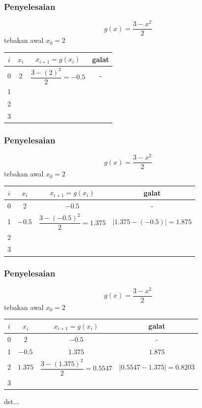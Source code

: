 \documentclass{beamer}
\begin{document}

\begin{frame}
\frametitle{Penyelesaian}
\begin{equation}
g(x) = \dfrac{3-x^2}{2}
\nonumber
\end{equation}
tebakan awal $x_0=2$
\\\begin{center}
\begin{tabular}{|c|c|c|c|}
\hline
	$i$ & $x_i$ & $x_{i+1} = g(x_i)$ & galat \\
\hline
	0 & 2 & $\dfrac{3 - (2)^2}{2} = -0.5$ & -\\
\hline
	1 &  &  & \\
\hline
	2 &  &  & \\
\hline
	3 &  &  & \\
\hline
\end{tabular}
\end{center}
\end{frame}


\begin{frame}
\frametitle{Penyelesaian}
\begin{equation}
g(x) = \dfrac{3-x^2}{2}
\nonumber
\end{equation}
tebakan awal $x_0=2$
\\\begin{center}
\begin{tabular}{|c|c|c|c|}
\hline
	$i$ & $x_i$ & $x_{i+1} = g(x_i)$ & galat \\
\hline
	0 & 2 & $-0.5$ & -\\
\hline
	1 & $-0.5$ & $\dfrac{3 - (-0.5)^2}{2} = 1.375$ & $|1.375 - (-0.5)| = 1.875$ \\
\hline
	2 &  &  & \\
\hline
	3 &  &  & \\
\hline
\end{tabular}
\end{center}
\end{frame}


\begin{frame}
\frametitle{Penyelesaian}
\begin{equation}
g(x) = \dfrac{3-x^2}{2}
\nonumber
\end{equation}
tebakan awal $x_0=2$
\\\begin{center}
\begin{tabular}{|c|c|c|c|}
\hline
	$i$ & $x_i$ & $x_{i+1} = g(x_i)$ & galat \\
\hline
	0 & $2$ & $-0.5$ & -\\
\hline
	1 & $-0.5$ & $1.375$ & $1.875$ \\
\hline
	2 & $1.375$ & $\dfrac{3 - (1.375)^2}{2} = 0.5547$ & $| 0.5547 - 1.375| = 0.8203$ \\
\hline
	3 &  &  & \\
\hline
\end{tabular}
\end{center}
dst...
\end{frame}
\end{document}
